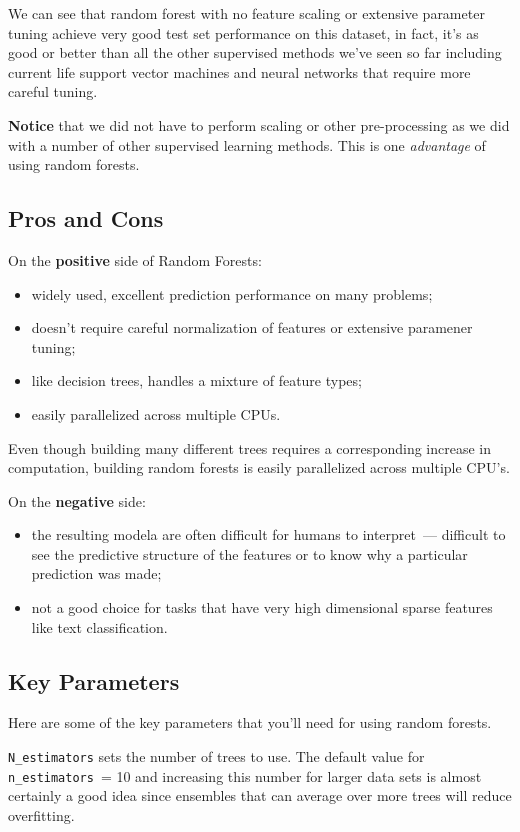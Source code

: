 \begin{multicols}{2}
We can see that random forest with no feature scaling or extensive parameter tuning achieve very good test set performance on this dataset, in fact, it's as good or better than all the other supervised methods we've seen so far including current life support vector machines and neural networks that require more careful tuning. 

\textbf{Notice} that we did not have to perform scaling or other pre-processing as we did with a number of other supervised learning methods. This is one \emph{advantage} of using random forests. 

\subsection{Pros and Cons}

On the \textbf{positive} side of Random Forests:
\begin{itemize}
\item widely used, excellent prediction performance on many problems;
\item doesn't require careful normalization of features or extensive paramener tuning;
\item like decision trees, handles a mixture of feature types;
\item easily parallelized across multiple CPUs.
\end{itemize}

Even though building many different trees requires a corresponding increase in computation, building random forests is easily parallelized across multiple CPU's. 


On the \textbf{negative} side:
\begin{itemize}
\item the resulting modela are often difficult for humans to interpret~--- difficult to see the predictive structure of the features or to know why a particular prediction was made;
\item not a good choice for tasks that have very high dimensional sparse features like text classification.
\end{itemize}

\subsection{Key Parameters}

Here are some of the key parameters that you'll need for using random forests. 

\texttt{N_estimators} sets the number of trees to use. The default value for \texttt{n_estimators}~= 10 and increasing this number for larger data sets is almost certainly a good idea since ensembles that can average over more trees will reduce overfitting. 


\end{multicols}
